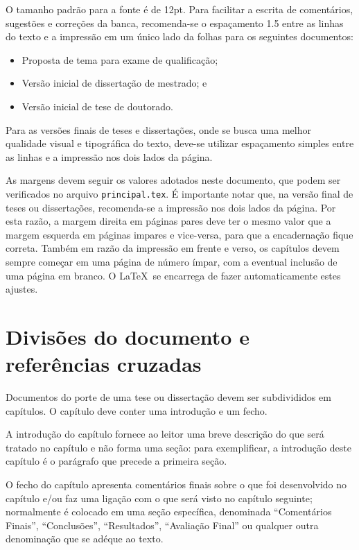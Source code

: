 O tamanho padrão para a fonte é de 12pt.  Para facilitar a escrita de
comentários, sugestões e correções da banca, recomenda-se o espaçamento
1.5 entre as linhas do texto e a impressão em um único lado da folhas
para os seguintes documentos:
\begin{itemize}
\item Proposta de tema para exame de qualificação;
\item Versão inicial de dissertação de mestrado; e
\item Versão inicial de tese de doutorado.
\end{itemize}
Para as versões finais de teses e dissertações, onde se busca uma
melhor qualidade visual e tipográfica do texto, deve-se utilizar
espaçamento simples entre as linhas e a impressão nos dois lados da
página.

As margens devem seguir os valores adotados neste documento, que podem
ser verificados no arquivo \texttt{principal.tex}. É importante notar
que, na versão final de teses ou dissertações, recomenda-se a
impressão nos dois lados da página. Por esta razão, a margem direita
em páginas pares deve ter o mesmo valor que a margem esquerda em
páginas impares e vice-versa, para que a encadernação fique
correta. Também em razão da impressão em frente e verso, os capítulos
devem sempre começar em uma página de número ímpar, com a eventual
inclusão de uma página em branco. O \LaTeX\ se encarrega de fazer
automaticamente estes ajustes.

\section{Divisões do documento e referências cruzadas}

Documentos do porte de uma tese ou dissertação devem ser subdivididos
em capítulos. O capítulo deve conter uma introdução e um fecho.

A introdução do capítulo fornece ao leitor uma breve descrição do que
será tratado no capítulo e não forma uma seção: para exemplificar, a
introdução deste capítulo é o parágrafo que precede a primeira seção.

O fecho do capítulo apresenta comentários finais sobre o que foi
desenvolvido no capítulo e/ou faz uma ligação com o que será visto no
capítulo seguinte; normalmente é colocado em uma seção específica,
denominada ``Comentários Finais'', ``Conclusões'', ``Resultados'',
``Avaliação Final'' ou qualquer outra denominação que se adéque ao
texto.

